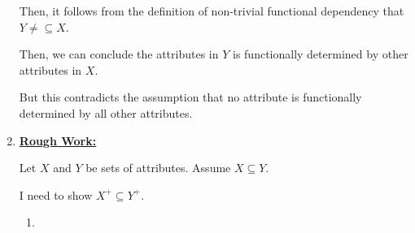 \documentclass[12pt]{article}
\begin{document}
\begin{enumerate}[1.]
        \bigskip

        Then, it follows from the definition of non-trivial functional dependency
        that $Y \neq\subseteq X$.

        \bigskip

        Then, we can conclude the attributes in $Y$ is functionally determined by other
        attributes in $X$.

        \bigskip

        But this contradicts the assumption that no attribute is functionally
        determined by all other attributes.

        \bigskip












        \item

        \begin{mdframed}
            \underline{\textbf{Rough Work:}}

            \bigskip

            Let $X$ and $Y$ be sets of attributes. Assume $X \subseteq Y$.

            \bigskip

            I need to show $X^+ \subseteq Y^+$.

            \bigskip

            \begin{enumerate}[1.]
                \item
            \end{enumerate}



        \end{mdframed}
\end{enumerate}
\end{document}
